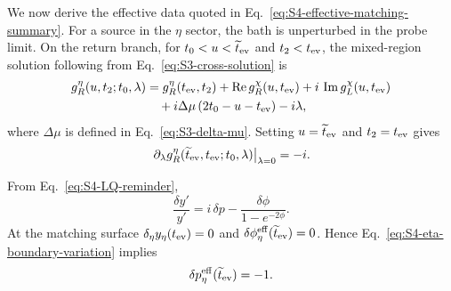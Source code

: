 \documentclass[11pt,a4paper]{article}
\begin{document}
We now derive the effective data quoted in
Eq.~\eqref{eq:S4-effective-matching-summary}. For a source in the \(\eta\)
sector, the bath is unperturbed in the probe limit. On the return branch,
for \(t_0<u<\widetilde t_{\rm ev}\) and \(t_2<t_{\rm ev}\), the mixed-region
solution following from Eq.~\eqref{eq:S3-cross-solution} is
\begin{equation}
\begin{aligned}
  g_R^\eta(u,t_2;t_0,\lambda)
  &=
  g_R^\eta(t_{\rm ev},t_2)
  +
  \operatorname{Re}g_R^\chi(u,t_{\rm ev})
  +
  i\,\operatorname{Im}g_L^\chi(u,t_{\rm ev})
  \\
  &\quad
  +
  i\Delta\mu\,
  (2t_0-u-t_{\rm ev})
  -
  i\lambda ,
\end{aligned}
\label{eq:S4-eta-kick-mixed-region}
\end{equation}
where \(\Delta\mu\) is defined in Eq.~\eqref{eq:S3-delta-mu}. Setting
\(u=\widetilde t_{\rm ev}\) and \(t_2=t_{\rm ev}\) gives
\begin{equation}
  \left.
  \partial_\lambda
  g_R^\eta(
  \widetilde t_{\rm ev},t_{\rm ev};t_0,\lambda)
  \right|_{\lambda=0}
  =
  -i.
\label{eq:S4-eta-boundary-variation}
\end{equation}

From Eq.~\eqref{eq:S4-LQ-reminder},
\begin{equation}
  \frac{\delta y'}{y'}
  =
  i\,\delta p
  -
  \frac{\delta\phi}{1-e^{-2\phi}}.
\label{eq:S4-yprime-variation}
\end{equation}
At the matching surface
\(\delta_\eta y_\eta(t_{\rm ev})=0\) and
\(\delta\phi_\eta^{\rm eff}(\widetilde t_{\rm ev})=0\). Hence
Eq.~\eqref{eq:S4-eta-boundary-variation} implies
\begin{equation}
  \delta p_\eta^{\rm eff}(\widetilde t_{\rm ev})
  =
  -1.
\label{eq:S4-eta-effective-momentum}
\end{equation}
\end{document}
